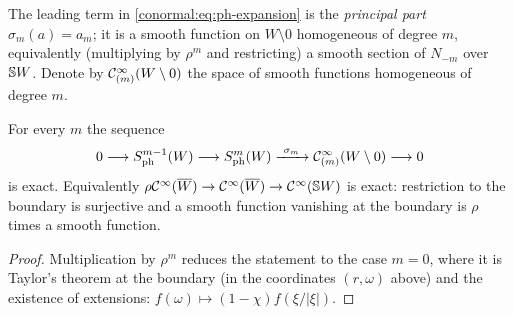 The leading term in \eqref{conormal:eq:ph-expansion} is the \emph{principal
part} $\sigma_m(a)=a_m$; it is a smooth function on $W\setminus0$ homogeneous
of degree $m$, equivalently (multiplying by $\rho^{m}$ and restricting) a
smooth section of $N_{-m}$ over $\mathbb{S} W$.  Denote by
$\mathcal{C}^\infty_{(m)}(W\setminus0)$ the space of smooth functions homogeneous of degree $m$.

\begin{proposition}\label{conormal:prop:ph-exact}
  For every $m$ the sequence
  \begin{equation*}
    0\longrightarrow\Symph{m-1}(W)\longrightarrow\Symph{m}(W)
    \xrightarrow{\ \sigma_m\ }\CI_{(m)}(W\setminus0)\longrightarrow0
  \end{equation*}
  is exact.  Equivalently $\rho\mathcal{C}^\infty(\overline{W})\to\mathcal{C}^\infty(\overline{W})\to\mathcal{C}^\infty(\mathbb{S} W)$ is
  exact: restriction to the boundary is surjective and a smooth function
  vanishing at the boundary is $\rho$ times a smooth function.
\end{proposition}
\begin{proof}
  Multiplication by $\rho^m$ reduces the statement to the case $m=0$, where it
  is Taylor's theorem at the boundary (in the coordinates $(r,\omega)$ above) and
  the existence of extensions: $f(\omega)\mapsto(1-\chi)f(\xi/|\xi|)$.
\end{proof}

